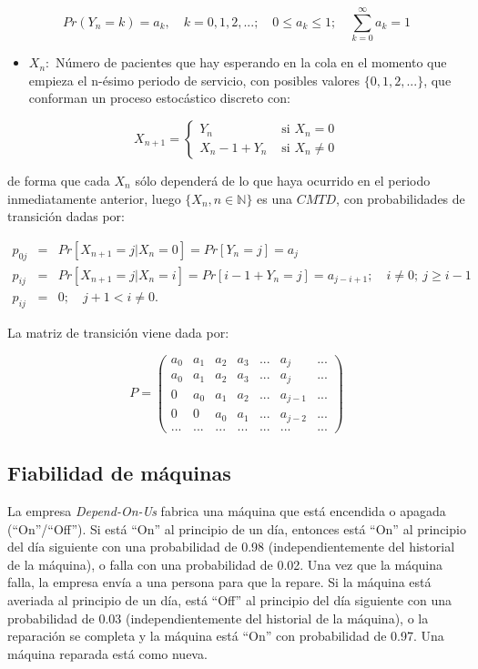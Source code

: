 \documentclass[
]{book}
\providecommand{\tightlist}{%
  \setlength{\itemsep}{0pt}\setlength{\parskip}{0pt}}
\theoremstyle{definition}
\theoremstyle{definition}
\theoremstyle{definition}
\theoremstyle{definition}
\theoremstyle{remark}
\begin{document}
\[Pr(Y_n = k) = a_k, \quad k=0, 1, 2,...; \quad 0 \leq a_k \leq 1; \quad \sum_{k=0}^{\infty} a_k =1\]

\begin{itemize}
\tightlist
\item
  \(X_n:\) Número de pacientes que hay esperando en la cola en el momento que empieza el n-ésimo periodo de servicio, con posibles valores \(\{0, 1, 2,...\}\), que conforman un proceso estocástico discreto con:
\end{itemize}

\begin{equation*}
X_{n+1} = 
\begin{cases}
Y_n & \text{ si } X_n = 0\\
X_n - 1 + Y_n & \text{ si } X_n \neq 0
\end{cases}
\end{equation*}

de forma que cada \(X_n\) sólo dependerá de lo que haya ocurrido en el periodo inmediatamente anterior, luego \(\{X_n, n \in \mathbb{N}\}\) es una \(CMTD\), con probabilidades de transición dadas por:

\begin{eqnarray*}
p_{0j} &=& Pr[X_{n+1} = j | X_{n} = 0] = Pr[Y_n = j] = a_j \\
p_{ij} &=&Pr[X_{n+1} = j | X_{n} = i] = Pr[i - 1 + Y_n = j] = a_{j-i+1}; \quad i\neq 0; \ j \geq i-1 \\
p_{ij} &=& 0; \quad j+1<i\neq0.
\end{eqnarray*}

La matriz de transición viene dada por:

\[P = 
\begin{pmatrix}
a_0 & a_1 & a_2 & a_3 &...& a_j & ...\\
a_0 & a_1 & a_2 & a_3 &...& a_j & ...\\
0 & a_0 & a_1 & a_2 &...& a_{j-1} & ...\\
0 & 0 & a_0 & a_1 &...& a_{j-2} & ...\\
... & ... & ... & ... &...& ... & ...
\end{pmatrix}\]

\hypertarget{fiabilidad}{%
\subsection{Fiabilidad de máquinas}\label{fiabilidad}}

La empresa \emph{Depend-On-Us} fabrica una máquina que está encendida o apagada (``On''/``Off''). Si está ``On'' al principio de un día, entonces está ``On'' al principio del día siguiente con una probabilidad de 0.98 (independientemente del historial de la máquina), o falla con una probabilidad de 0.02. Una vez que la máquina falla, la empresa envía a una persona para que la repare. Si la máquina está averiada al principio de un día, está ``Off'' al principio del día siguiente con una probabilidad de 0.03 (independientemente del historial de la máquina), o la reparación se completa y la máquina está ``On'' con probabilidad de 0.97. Una máquina reparada está como nueva.
\end{document}

